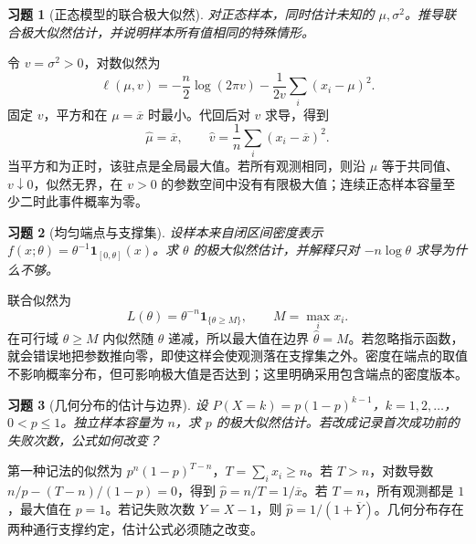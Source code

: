 \documentclass[UTF8,12pt,a4paper,fontset=fandol]{ctexart}
\newtheorem{exercise}{习题}[section]
\begin{document}
\begin{exercise}[正态模型的联合极大似然]\label{q:B10.1}
对正态样本，同时估计未知的 $\mu,\sigma^2$。推导联合极大似然估计，并说明样本所有值相同的特殊情形。\par{}
\end{exercise}

\begin{solve}\label{a:B10.1}令 $v=\sigma^2>0$，对数似然为\[\ell(\mu,v)=-\frac n2\log(2\pi v)-\frac{1}{2v}\sum_i(x_i-\mu)^2.\]固定 $v$，平方和在 $\mu=\overline x$ 时最小。代回后对 $v$ 求导，得到\[\widehat\mu=\overline x,\qquad\widehat v=\frac1n\sum_i(x_i-\overline x)^2.\]当平方和为正时，该驻点是全局最大值。若所有观测相同，则沿 $\mu$ 等于共同值、$v\downarrow0$，似然无界，在 $v>0$ 的参数空间中没有有限极大值；连续正态样本容量至少二时此事件概率为零。\end{solve}

\begin{exercise}[均匀端点与支撑集]\label{q:B10.2}
设样本来自闭区间密度表示 $f(x;\theta)=\theta^{-1}\mathbf1_{[0,\theta]}(x)$。求 $\theta$ 的极大似然估计，并解释只对 $-n\log\theta$ 求导为什么不够。\par{}
\end{exercise}

\begin{solve}\label{a:B10.2}联合似然为\[L(\theta)=\theta^{-n}\mathbf1_{\{\theta\ge M\}},\qquad M=\max_i x_i.\]在可行域 $\theta\ge M$ 内似然随 $\theta$ 递减，所以最大值在边界 $\widehat\theta=M$。若忽略指示函数，就会错误地把参数推向零，即使这样会使观测落在支撑集之外。密度在端点的取值不影响概率分布，但可影响极大值是否达到；这里明确采用包含端点的密度版本。\end{solve}

\begin{exercise}[几何分布的估计与边界]\label{q:B10.3}
设 $P(X=k)=p(1-p)^{k-1}$，$k=1,2,\ldots$，$0<p\le1$。独立样本容量为 $n$，求 $p$ 的极大似然估计。若改成记录首次成功前的失败次数，公式如何改变？\par{}
\end{exercise}

\begin{solve}\label{a:B10.3}第一种记法的似然为 $p^n(1-p)^{T-n}$，$T=\sum_i x_i\ge n$。若 $T>n$，对数导数 $n/p-(T-n)/(1-p)=0$，得到 $\widehat p=n/T=1/\overline x$。若 $T=n$，所有观测都是 $1$，最大值在 $p=1$。若记失败次数 $Y=X-1$，则 $\widehat p=1/(1+\overline Y)$。几何分布存在两种通行支撑约定，估计公式必须随之改变。\end{solve}
\end{document}
